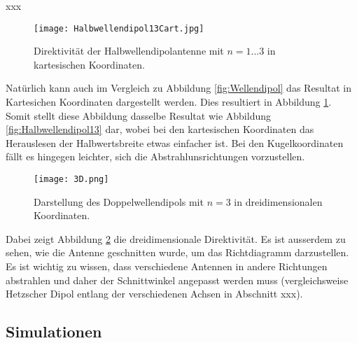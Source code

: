 xxx

\begin{figure}[!ht]
	\centering
    \texttt{[image: Halbwellendipol13Cart.jpg]}
    \caption{Direktivität der Halbwellendipolantenne mit $n = 1 ... 3$ in kartesischen Koordinaten.}
    \label{fig:Halbwellendipol13Cart}
\end{figure}

Natürlich kann auch im Vergleich zu Abbildung \ref{fig:Wellendipol} das Resultat in Kartesichen Koordinaten dargestellt werden. Dies resultiert in Abbildung \ref{fig:Halbwellendipol13Cart}. Somit stellt diese Abbildung dasselbe Resultat wie Abbildung \ref{fig:Halbwellendipol13} dar, wobei bei den kartesischen Koordinaten das Herauslesen der Halbwertsbreite etwas einfacher ist. Bei den Kugelkoordinaten fällt es hingegen leichter, sich die Abstrahlunsrichtungen vorzustellen.

\begin{figure}[!ht]
	\centering
    \texttt{[image: 3D.png]}
    \caption{Darstellung des Doppelwellendipols mit $n = 3$ in dreidimensionalen Koordinaten.}
    \label{fig:3D}
\end{figure}

Dabei zeigt Abbildung \ref{fig:3D} die dreidimensionale Direktivität. Es ist ausserdem zu sehen, wie die Antenne geschnitten wurde, um das Richtdiagramm darzustellen. Es ist wichtig zu wissen, dass verschiedene Antennen in andere Richtungen abstrahlen und daher der Schnittwinkel angepasst werden muss (vergleichsweise Hetzscher Dipol entlang der verschiedenen Achsen in Abschnitt xxx).

\subsection{Simulationen}

